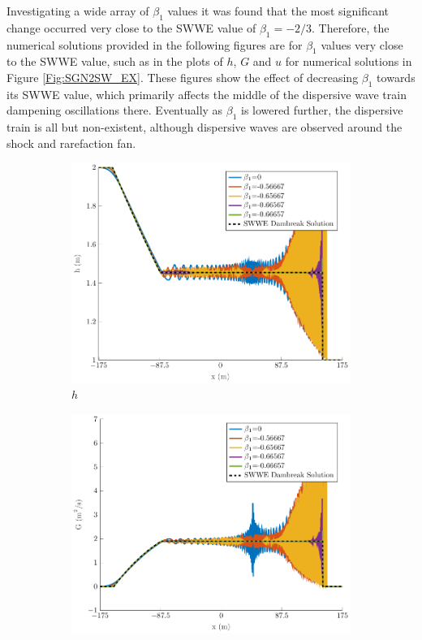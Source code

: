 \documentclass[10pt]{elsarticle}
\begin{document}
Investigating a wide array of $\beta_1$ values it was found that the most significant change occurred very close to the SWWE value of $\beta_1 = -2/3$. Therefore, the numerical solutions provided in the following figures are for $\beta_1$ values very close to the SWWE value, such as in the plots of $h$, $G$ and $u$ for numerical solutions in Figure \ref{Fig:SGN2SW_EX}. These figures show the effect of decreasing $\beta_1$ towards its SWWE value, which primarily affects the middle of the dispersive wave train dampening oscillations there. Eventually as $\beta_1$ is lowered further, the dispersive train is all but non-existent, although dispersive waves are observed around the shock and rarefaction fan. 
%
\begin{figure}
	\centering
	\begin{subfigure}{0.32\textwidth}
		\centering
		\includegraphics[width=\textwidth]{./Figures/Simulations/Study/Serre2SWWECloser/h.pdf}
		\caption{$h$}
	\end{subfigure}
	\begin{subfigure}{0.32\textwidth}
		\centering
		\includegraphics[width=\textwidth]{./Figures/Simulations/Study/Serre2SWWECloser/G.pdf}

\end{subfigure}
\end{figure}
\end{document}
